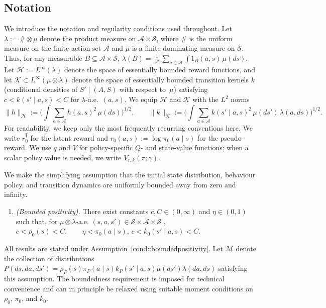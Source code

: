 \documentclass[12pt]{article}
\theoremstyle{plain}
\begin{document}
 

\subsection{Notation}
\label{sec::notation}

We introduce the notation and regularity conditions used throughout.  Let
$\lambda := \# \otimes \mu$ denote the product measure on $\mathcal{A} \times
\mathcal{S}$, where $\#$ is the uniform measure on the finite action set
$\mathcal{A}$ and $\mu$ is a finite dominating measure on $\mathcal{S}$.  Thus,
for any measurable $B \subseteq \mathcal{A} \times \mathcal{S}$, $\lambda(B)
= \tfrac{1}{|\mathcal{A}|} \sum_{a \in \mathcal{A}}
  \int 1_B(a,s)\,\mu(ds).$
Let $\mathcal{H} := L^\infty(\lambda)$ denote the space of essentially bounded
reward functions, and let $\mathcal{K} \subset L^\infty(\mu \otimes \lambda)$
denote the space of essentially bounded transition kernels $k$ (conditional
densities of $S' \mid (A,S)$ with respect to~$\mu$) satisfying $c < k(s' \mid
a,s) < C$ for $\lambda$-a.e.\ $(a,s)$.  We equip $\mathcal{H}$ and $\mathcal{K}$
with the $L^2$ norms
\[
\|h\|_{\mathcal{H}}
:= \Bigg( \int \sum_{a \in \mathcal{A}} h(a,s)^2\,\mu(ds) \Bigg)^{1/2},
\qquad
\|k\|_{\mathcal{K}}
:= \Bigg( \int \sum_{a \in \mathcal{A}} k(s' \mid a,s)^2\,
            \mu(ds')\,\lambda(a,ds) \Bigg)^{1/2}.
\]
For readability, we keep only the most frequently recurring conventions here.
We write \(r_0^\dagger\) for the latent reward and
\(r_0(a,s):=\log \pi_0(a\mid s)\) for the pseudo-reward. We use \(q\) and
\(V\) for policy-specific \(Q\)- and state-value functions; when a scalar policy
value is needed, we write \(V_{r,k}(\pi;\gamma)\). 

We make the simplifying assumption that the initial state distribution,
behaviour policy, and transition dynamics are uniformly bounded away from zero
and infinity.
\begin{enumerate}[label=\textbf{(A\arabic*)}, ref=A\arabic*, series=posit]
\item \textit{(Bounded positivity).}\label{cond::boundedpositivity}
There exist constants \(c,C\in(0,\infty)\) and \(\eta\in(0,1)\) such that, for
\(\mu\otimes\lambda\)-a.e. $(s,a,s')\in\mathcal{S}\times\mathcal{A}\times\mathcal{S}$ ,$ c<\rho_0(s)<C,\qquad
\eta<\pi_0(a\mid s)$, $c<k_0(s'\mid a,s)<C.$
\end{enumerate}
All results are stated under Assumption~\ref{cond::boundedpositivity}. Let
\(\mathcal{M}\) denote the collection of distributions
\(P(ds,da,ds')=\rho_P(s)\pi_P(a\mid s)k_P(s'\mid a,s)\mu(ds')\lambda(da,ds)\)
satisfying this assumption. The boundedness requirement is imposed for
technical convenience and can in principle be relaxed using suitable moment
conditions on \(\rho_0\), \(\pi_0\), and \(k_0\).
 
\end{document}
